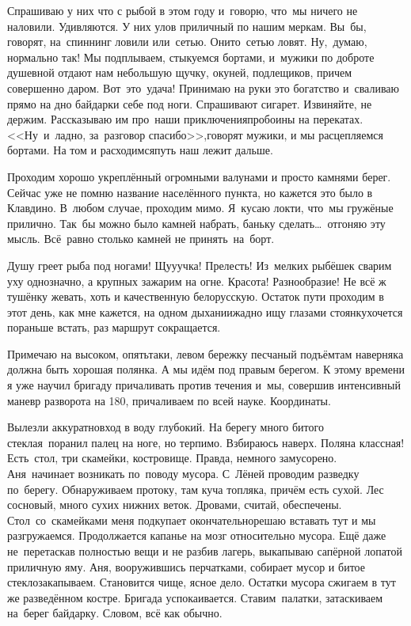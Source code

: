Спрашиваю у них что с рыбой в этом году и~говорю, что~мы ничего не наловили. Удивляются. У них улов приличный по нашим меркам. Вы~бы, говорят, на~спиннинг ловили или~сетью. Они\sdash то~сетью ловят. Ну,~думаю, нормально так! Мы подплываем, стыкуемся бортами, и~мужики по доброте душевной отдают нам небольшую щучку, окуней, подлещиков, причем совершенно даром. Вот~это~удача! Принимаю на руки это богатство и~сваливаю прямо на дно байдарки себе под ноги. Спрашивают сигарет. Извиняйте, не держим. Рассказываю им про~наши приключения\mdash пробоины на перекатах. <<Ну~и~ладно, за~разговор спасибо>>,\mdash говорят мужики, и мы расцепляемся бортами. На том и расходимся\mdash путь наш лежит дальше.

Проходим хорошо укреплённый огромными валунами и просто камнями берег. Сейчас уже не помню название населённого пункта, но кажется это было в Клавдино. В~любом случае, проходим мимо. Я~кусаю локти, что~мы гружёные прилично. Так~бы можно было камней набрать, баньку сделать\ldots~отгоняю эту мысль. Всё~равно столько камней не принять~на~борт.

Душу греет рыба под ногами! Щу\sdash у\sdash учка! Прелесть! Из~мелких рыбёшек сварим уху однозначно, а крупных зажарим на огне. Красота! Разнообразие! Не всё ж тушёнку жевать, хоть и качественную белорусскую. Остаток пути проходим в этот день, как мне кажется, на одном дыхании\mdash жадно ищу глазами стоянку\mdash хочется пораньше встать, раз маршрут сокращается. 

Примечаю на высоком, опять\sdash таки, левом бережку песчаный подъём\mdash там наверняка должна быть хорошая полянка. А мы идём под правым берегом. К этому времени я уже научил бригаду причаливать против течения и~мы, совершив интенсивный маневр разворота на 180\degree, причаливаем по всей науке. Координаты. 

Вылезли аккуратно\mdash вход в воду глубокий. На берегу много битого стекла\mdash я~поранил палец на ноге, но терпимо. Взбираюсь наверх. Поляна классная! Есть~стол, три скамейки, костровище. Правда, немного замусорено. Аня~начинает возникать по~поводу мусора. С~Лёней проводим разведку по~берегу. Обнаруживаем протоку, там куча топляка, причём есть сухой. Лес сосновый, много сухих нижних веток. Дровами, считай, обеспечены. Стол~со~скамейками меня подкупает окончательно\mdash решаю вставать тут и мы разгружаемся. Продолжается капанье на мозг относительно мусора. Ещё даже не~перетаскав полностью вещи и не разбив лагерь, выкапываю сапёрной лопатой приличную яму. Аня, вооружившись перчатками, собирает мусор и битое стекло\mdash закапываем. Становится чище, ясное дело. Остатки мусора сжигаем в тут же разведённом костре. Бригада успокаивается. Ставим~палатки, затаскиваем на~берег байдарку. Словом, всё как обычно. 

